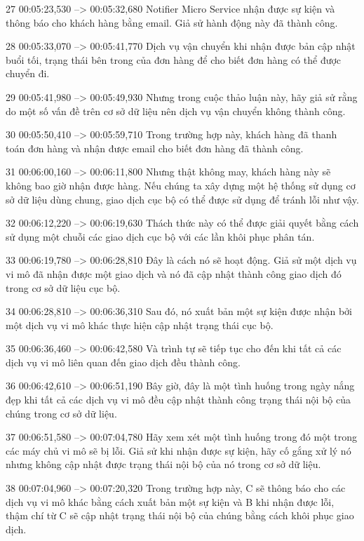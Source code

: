 27
00:05:23,530 --> 00:05:32,680
Notifier Micro Service nhận được sự kiện và thông báo cho khách hàng bằng email.  Giả sử hành động này đã thành công.

28
00:05:33,070 --> 00:05:41,770
Dịch vụ vận chuyển khi nhận được bản cập nhật buổi tối, trạng thái bên trong của đơn hàng để cho biết đơn hàng có thể được chuyển đi.

29
00:05:41,980 --> 00:05:49,930
Nhưng trong cuộc thảo luận này, hãy giả sử rằng do một số vấn đề trên cơ sở dữ liệu nên dịch vụ vận chuyển không thành công.

30
00:05:50,410 --> 00:05:59,710
Trong trường hợp này, khách hàng đã thanh toán đơn hàng và nhận được email cho biết đơn hàng đã thành công.

31
00:06:00,160 --> 00:06:11,800
Nhưng thật không may, khách hàng này sẽ không bao giờ nhận được hàng.  Nếu chúng ta xây dựng một hệ thống sử dụng cơ sở dữ liệu dùng chung, giao dịch cục bộ có thể được sử dụng để tránh lỗi như vậy.

32
00:06:12,220 --> 00:06:19,630
Thách thức này có thể được giải quyết bằng cách sử dụng một chuỗi các giao dịch cục bộ với các lần khôi phục phân tán.

33
00:06:19,780 --> 00:06:28,810
Đây là cách nó sẽ hoạt động.  Giả sử một dịch vụ vi mô đã nhận được một giao dịch và nó đã cập nhật thành công giao dịch đó trong cơ sở dữ liệu cục bộ.

34
00:06:28,810 --> 00:06:36,310
Sau đó, nó xuất bản một sự kiện được nhận bởi một dịch vụ vi mô khác thực hiện cập nhật trạng thái cục bộ.

35
00:06:36,460 --> 00:06:42,580
Và trình tự sẽ tiếp tục cho đến khi tất cả các dịch vụ vi mô liên quan đến giao dịch đều thành công.

36
00:06:42,610 --> 00:06:51,190
Bây giờ, đây là một tình huống trong ngày nắng đẹp khi tất cả các dịch vụ vi mô đều cập nhật thành công trạng thái nội bộ của chúng trong cơ sở dữ liệu.

37
00:06:51,580 --> 00:07:04,780
Hãy xem xét một tình huống trong đó một trong các máy chủ vi mô sẽ bị lỗi.  Giả sử khi nhận được sự kiện, hãy cố gắng xử lý nó nhưng không cập nhật được trạng thái nội bộ của nó trong cơ sở dữ liệu.

38
00:07:04,960 --> 00:07:20,320
Trong trường hợp này, C sẽ thông báo cho các dịch vụ vi mô khác bằng cách xuất bản một sự kiện và B khi nhận được lỗi, thậm chí từ C sẽ cập nhật trạng thái nội bộ của chúng bằng cách khôi phục giao dịch.

